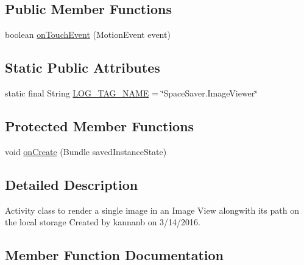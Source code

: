 \subsection*{Public Member Functions}
\begin{DoxyCompactItemize}
\item 
boolean \hyperlink{classcourse_1_1examples_1_1spacesaver_1_1_image_viewer_a1b01127ae6b5efe2d351adbacd678435}{on\+Touch\+Event} (Motion\+Event event)
\end{DoxyCompactItemize}
\subsection*{Static Public Attributes}
\begin{DoxyCompactItemize}
\item 
static final String \hyperlink{classcourse_1_1examples_1_1spacesaver_1_1_image_viewer_af01160015f24efaa8925b71c742633b7}{L\+O\+G\+\_\+\+T\+A\+G\+\_\+\+N\+A\+M\+E} = \char`\"{}Space\+Saver.\+Image\+Viewer\char`\"{}
\end{DoxyCompactItemize}
\subsection*{Protected Member Functions}
\begin{DoxyCompactItemize}
\item 
void \hyperlink{classcourse_1_1examples_1_1spacesaver_1_1_image_viewer_a6bcc20e17948af4e83864323bf8aafd3}{on\+Create} (Bundle saved\+Instance\+State)
\end{DoxyCompactItemize}


\subsection{Detailed Description}
Activity class to render a single image in an Image View alongwith its path on the local storage Created by kannanb on 3/14/2016. 

\subsection{Member Function Documentation}
\hypertarget{classcourse_1_1examples_1_1spacesaver_1_1_image_viewer_a6bcc20e17948af4e83864323bf8aafd3}{}
